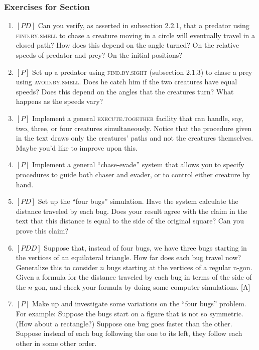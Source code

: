 \documentclass{book}
\begin{document}
\subsubsection{Exercises for Section \thesection}
\begin{enumerate}
\item $[PD]$ Can you verify, as asserted in subsection 2.2.1, that a predator
using \textsc{find}\textsc{.by}\textsc{.smell} to chase a creature moving in a circle will eventually travel in a closed path? How does this depend on the angle turned?
On the relative speeds of predator and prey? On the initial positions?
\item $[P]$ Set up a predator using \textsc{find}\textsc{.by}\textsc{.sight} (subsection 2.1.3) to chase
a prey using \textsc{avoid}\textsc{.by}\textsc{.smell}. Does he catch him if the two creatures
have equal speeds? Does this depend on the angles that the creatures
turn? What happens as the speeds vary?
\item $[P]$ Implement a general \textsc{execute}\textsc{.together} facility that can handle,
say, two, three, or four creatures simultaneously. Notice that the procedure given in the text draws only the creatures' paths and not the
creatures themselves. Maybe you'd like to improve upon this.
\item $[P]$ Implement a general ``chase-evade'' system that allows you to
specify procedures to guide both chaser and evader, or to control either
creature by hand.
\item $[PD]$ Set up the ``four bugs'' simulation. Have the system calculate
the distance traveled by each bug. Does your result agree with the claim
in the text that this distance is equal to the side of the original square?
Can you prove this claim?
\item $[PDD]$ Suppose that, instead of four bugs, we have three bugs starting
in the vertices of an equilateral triangle. How far does each bug travel
now? Generalize this to consider $n$ bugs starting at the vertices of a
regular n-gon. Given a formula for the distance traveled by each bug in
terms of the side of the $n$-gon, and check your formula by doing some
computer simulations. [A]
\item $[P]$ Make up and investigate some variations on the ``four bugs''
problem. For example: Suppose the bugs start on a figure that is not so
symmetric. (How about a rectangle?) Suppose one bug goes faster than
the other. Suppose instead of each bug following the one to its left, they
follow each other in some other order.

\end{enumerate}
\end{document}
